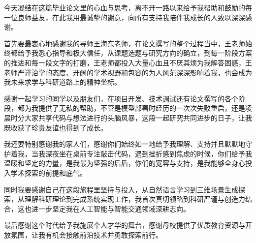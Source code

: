 \begin{acknowledgements} 
	
	今天凝结在这篇毕业论文里的心血与思考，离不开一路以来给予我帮助和鼓励的每一位良师益友，在此我用最诚挚的谢意，向所有支持我陪伴我成长的人致以深深感谢。
	
	首先要最衷心地感谢我的导师王海东老师，在论文撰写的整个过程当中，王老师始终都给予我悉心指导和极大信任，从课题选题与研究方向的确立，到每一阶段方案的推进和每一段文字的打磨，王老师都投入大量心血且不厌其烦为我解答困惑，王老师严谨治学的态度、开阔的学术视野和包容的为人风范深深影响着我，也会成为我未来求学与科研道路上的精神坐标。
	
	感谢一起学习的同学以及朋友们，在项目开发、技术调试还有论文撰写的各个阶段，都为我提供了无私的帮助，不管是模型部署时经历的一次次失败重启，还是凌晨时分大家共享代码与想法进行的头脑风暴，这段一起研究共同进步的日子，让我既收获了珍贵友谊也得到了成长。
	
	我还要特别感谢我的家人们，感谢你们始终如一地给予我理解、支持并且默默地守护着我，当我深夜坐在桌前专注敲击代码，遇到挫折感到焦虑的时候，你们给予我温暖和坚定的力量，是我最为坚强的后盾，你们的宽容与支持，是我能够全身心投入学术探索的前提和底气。
	
同时我要感谢自己在这段旅程里坚持与投入，从自然语言学习到三维场景生成探索，从理解科研理论到完成系统实现工作，我首次真切领略到科研严谨与创造力结合，这也进一步坚定我在人工智能与智能交通领域深耕志向。

最后感谢这个时代给予我施展个人才华的舞台，感谢母校提供了优质教育资源与开放氛围，让我有机会接触前沿技术并勇敢探索前行。
	
\end{acknowledgements}